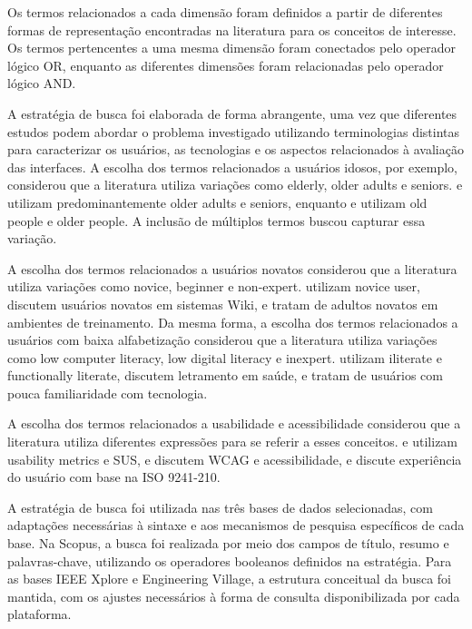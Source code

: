 Os termos relacionados a cada dimensão foram definidos a partir de diferentes formas de representação encontradas na literatura para os conceitos de interesse. Os termos pertencentes a uma mesma dimensão foram conectados pelo operador lógico OR, enquanto as diferentes dimensões foram relacionadas pelo operador lógico AND.

A estratégia de busca foi elaborada de forma abrangente, uma vez que diferentes estudos podem abordar o problema investigado utilizando terminologias distintas para caracterizar os usuários, as tecnologias e os aspectos relacionados à avaliação das interfaces. A escolha dos termos relacionados a usuários idosos, por exemplo, considerou que a literatura utiliza variações como elderly, older adults e seniors. \cite{kurniawan2005research} e \cite{dombrovskaia2021guideline} utilizam predominantemente older adults e seniors, enquanto \cite{sun2010preliminary} e \cite{ahmad2013teaching} utilizam old people e older people. A inclusão de múltiplos termos buscou capturar essa variação.

A escolha dos termos relacionados a usuários novatos considerou que a literatura utiliza variações como novice, beginner e non-expert. \cite{nosseir2011novice} utilizam novice user, \cite{cowan2011exploring} discutem usuários novatos em sistemas Wiki, e \cite{kabassi2004personalised} tratam de adultos novatos em ambientes de treinamento. Da mesma forma, a escolha dos termos relacionados a usuários com baixa alfabetização considerou que a literatura utiliza variações como low computer literacy, low digital literacy e inexpert. \cite{filgueiras2009recoverability} utilizam iliterate e functionally literate, \cite{barron2013feasibility} discutem letramento em saúde, e \cite{ahmad2013teaching} tratam de usuários com pouca familiaridade com tecnologia.

A escolha dos termos relacionados a usabilidade e acessibilidade considerou que a literatura utiliza diferentes expressões para se referir a esses conceitos. \cite{weighted_heuristic} e \cite{allah2021empathy} utilizam usability metrics e SUS, \cite{wickramathilaka2023addressing} e \cite{gonzalez2025augmenting} discutem WCAG e acessibilidade, e \cite{gatsou2017seniors} discute experiência do usuário com base na ISO 9241-210.

A estratégia de busca foi utilizada nas três bases de dados selecionadas, com adaptações necessárias à sintaxe e aos mecanismos de pesquisa específicos de cada base. Na Scopus, a busca foi realizada por meio dos campos de título, resumo e palavras-chave, utilizando os operadores booleanos definidos na estratégia. Para as bases IEEE Xplore e Engineering Village, a estrutura conceitual da busca foi mantida, com os ajustes necessários à forma de consulta disponibilizada por cada plataforma.

